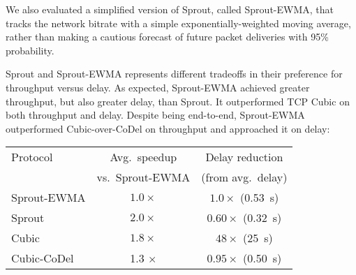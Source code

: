 We also evaluated a simplified version of Sprout, called Sprout-EWMA,
that tracks the network bitrate with a simple exponentially-weighted
moving average, rather than making a cautious forecast of future
packet deliveries with 95\% probability.

Sprout and Sprout-EWMA represents different tradeoffs in their
preference for throughput versus delay.  As expected, Sprout-EWMA
achieved greater throughput, but also greater delay, than Sprout. It
outperformed TCP Cubic on both throughput and delay. Despite being
end-to-end, Sprout-EWMA outperformed Cubic-over-CoDel on throughput
and approached it on delay:

\vspace{\baselineskip}

\noindent \begin{tabular}{|l|c|c|}
\hline
Protocol & Avg.~speedup & Delay reduction \\
& \footnotesize{vs.~Sprout-EWMA} & \footnotesize{(from avg.~delay)}\\
\hline
\hline
\cellcolor{blue!20}Sprout-EWMA & \cellcolor{blue!20}$1.0\times$ & \cellcolor{blue!20}$1.0\times$ (0.53~s) \\
\hline
Sprout & $2.0\times$ & \cellcolor{red!20}$0.60\times$ (0.32~s) \\
Cubic & $1.8\times$ & $48 \times$ (25~s)\\
\hline
Cubic-CoDel & 1.3 $\times$ & \cellcolor{red!20}$0.95\times$ (0.50~s)\\
\hline
\end{tabular}

\vspace{\baselineskip}



